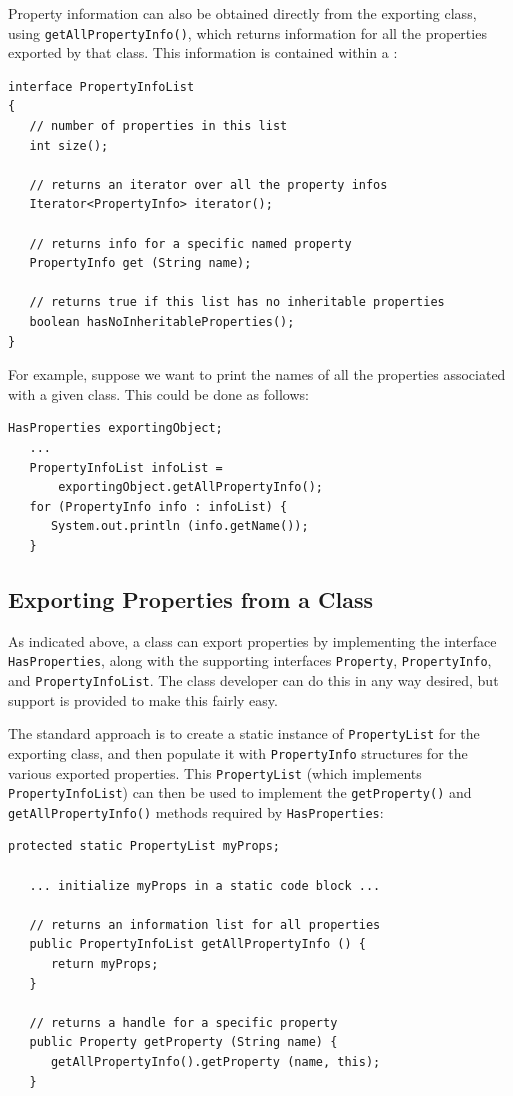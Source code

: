 \documentclass{article}
\begin{document}
Property information can also be obtained directly from the exporting
class, using {\tt getAllPropertyInfo()}, which returns
information for all the properties exported by that class. This
information is contained within a 
:
\begin{lstlisting}[]
interface PropertyInfoList
{
   // number of properties in this list
   int size(); 

   // returns an iterator over all the property infos
   Iterator<PropertyInfo> iterator();

   // returns info for a specific named property
   PropertyInfo get (String name);

   // returns true if this list has no inheritable properties
   boolean hasNoInheritableProperties();
}
\end{lstlisting}
For example, suppose we want to print the names of all the
properties associated with a given class. This could
be done as follows:
\begin{lstlisting}[]
   HasProperties exportingObject;
   ...
   PropertyInfoList infoList = 
       exportingObject.getAllPropertyInfo();
   for (PropertyInfo info : infoList) {
      System.out.println (info.getName());
   }
\end{lstlisting}

\label{exportingSec}
\subsection{Exporting Properties from a Class }

As indicated above, a class can export properties by implementing the
interface {\tt HasProperties}, along with the supporting interfaces
{\tt Property}, {\tt PropertyInfo}, and {\tt PropertyInfoList}.  The
class developer can do this in any way desired, but support is
provided to make this fairly easy.

The standard approach is to create a static instance of 
{\tt PropertyList} for the exporting class, and then populate it with
{\tt PropertyInfo} structures for the various exported properties. This
{\tt PropertyList} (which implements {\tt PropertyInfoList}) can then
be used to implement the {\tt getProperty()} and {\tt getAllPropertyInfo()} 
methods required by {\tt HasProperties}:
\begin{lstlisting}[]
   protected static PropertyList myProps;
 
   ... initialize myProps in a static code block ...

   // returns an information list for all properties
   public PropertyInfoList getAllPropertyInfo () {
      return myProps;
   }

   // returns a handle for a specific property
   public Property getProperty (String name) {
      getAllPropertyInfo().getProperty (name, this);
   }
\end{lstlisting}
\end{document}
